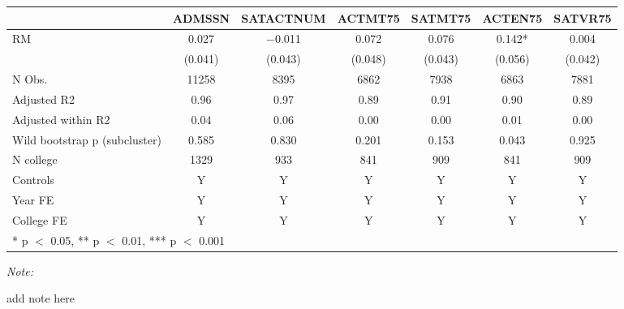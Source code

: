 \begin{table}
\centering
\begin{threeparttable}
\begin{tabular}[t]{lcccccc}
\toprule
  & ADMSSN & SATACTNUM & ACTMT75 & SATMT75 & ACTEN75 & SATVR75\\
\midrule
RM & \num{0.027} & \num{-0.011} & \num{0.072} & \num{0.076} & \num{0.142}* & \num{0.004}\\
 & (\num{0.041}) & (\num{0.043}) & (\num{0.048}) & (\num{0.043}) & (\num{0.056}) & (\num{0.042})\\
\midrule
N Obs. & \num{11258} & \num{8395} & \num{6862} & \num{7938} & \num{6863} & \num{7881}\\
Adjusted R2 & \num{0.96} & \num{0.97} & \num{0.89} & \num{0.91} & \num{0.90} & \num{0.89}\\
Adjusted within R2 & \num{0.04} & \num{0.06} & \num{0.00} & \num{0.00} & \num{0.01} & \num{0.00}\\
Wild bootstrap p (subcluster) & 0.585 & 0.830 & 0.201 & 0.153 & 0.043 & 0.925\\
N college & 1329 & 933 & 841 & 909 & 841 & 909\\
Controls & Y & Y & Y & Y & Y & Y\\
Year FE & Y & Y & Y & Y & Y & Y\\
College FE & Y & Y & Y & Y & Y & Y\\
\bottomrule
\multicolumn{7}{l}{\rule{0pt}{1em}* p $<$ 0.05, ** p $<$ 0.01, *** p $<$ 0.001}\\
\end{tabular}
\begin{tablenotes}
\item \textit{Note: } 
\item add note here
\end{tablenotes}
\end{threeparttable}
\end{table}

